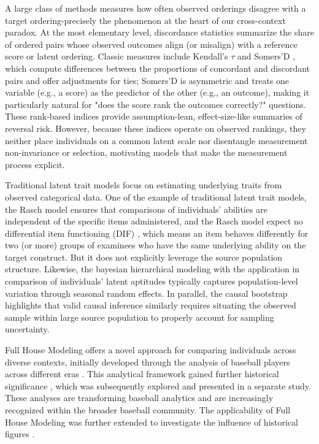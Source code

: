 \documentclass[12pt]{article}
\begin{document}
A large class of methods measures how often observed orderings disagree with a target ordering-precisely the phenomenon at the heart of our cross-context paradox. At the most elementary level, discordance statistics summarize the share of ordered pairs whose observed outcomes align (or misalign) with a reference score or latent ordering. Classic measures include Kendall's $\tau$ \citep{kendall1938new} and Somers'D \citep{somers1962new}, which compute differences between the proportions of concordant and discordant pairs and offer adjustments for ties; Somers'D is asymmetric and treats one variable (e.g., a score) as the predictor of the other (e.g., an outcome), making it particularly natural for "does the score rank the outcomes correctly?" questions. These rank-based indices provide assumption-lean, effect-size-like summaries of reversal risk. However, because these indices operate on observed rankings, they neither place individuals on a common latent scale nor disentangle measurement non-invariance or selection, motivating models that make the measurement process explicit.

Traditional latent trait models \citep{bartholomew2011latent} focus on estimating underlying traits from observed categorical data. One of the example of traditional latent trait models, the Rasch model \citep{bond2013applying} ensures that comparisons of individuals' abilities are independent of the specific items administered, and the Rasch model expect no differential item functioning (DIF) \citep{holland2012differential}, which means an item behaves differently for two (or more) groups of examinees who have the same underlying ability on the target construct. But it does not explicitly leverage the source population structure. Likewise, the bayesian hierarchical modeling \citep{BRL99} with the application in comparison of individuals' latent aptitudes typically captures population-level variation through seasonal random effects. In parallel, the causal bootstrap \citep{imbens2018causal} highlights that valid causal inference similarly requires situating the observed sample within large source population to properly account for sampling uncertainty. 

Full House Modeling offers a novel approach for comparing individuals across diverse contexts, initially developed through the analysis of baseball players across different eras \citep{yan2025comparing}. This analytical framework gained further historical significance \citep{burgos2025change}, which was subsequently explored and presented in a separate study. These analyses are transforming baseball analytics and are increasingly recognized within the broader baseball community. The applicability of Full House Modeling was further extended to investigate the influence of historical figures \citep{cohen2025contextualizing}. 
\end{document}
